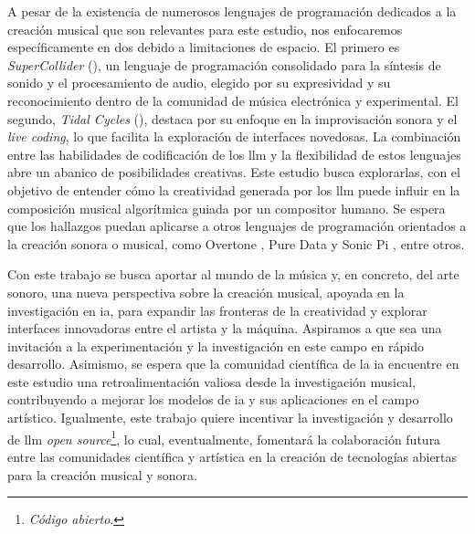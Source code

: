 A pesar de la existencia de numerosos lenguajes de programación dedicados a la creación musical que son relevantes para este estudio, nos enfocaremos específicamente en dos debido a limitaciones de espacio. El primero es \emph{SuperCollider} (\citeyear{SuperCollider2024}), un lenguaje de programación consolidado para la síntesis de sonido y el procesamiento de audio, elegido por su expresividad y su reconocimiento dentro de la comunidad de música electrónica y experimental. El segundo, \emph{Tidal Cycles} (\citeyear{TidalCycles}), destaca por su enfoque en la improvisación sonora y el \emph{live coding}, lo que facilita la exploración de interfaces novedosas. La combinación entre las habilidades de codificación de los \gls{llm} y la flexibilidad de estos lenguajes abre un abanico de posibilidades creativas. Este estudio busca explorarlas, con el objetivo de entender cómo la creatividad generada por los \gls{llm} puede influir en la composición musical algorítmica guiada por un compositor humano. Se espera que los hallazgos puedan aplicarse a otros lenguajes de programación orientados a la creación sonora o musical, como {Overtone} \citep{OvertoneCollaborativeProgrammable}, {Pure Data} \citep{PureDataPd} y {Sonic Pi} \citep{SonicPiLive}, entre otros.

Con este trabajo se busca aportar al mundo de la música y, en concreto, del arte sonoro, una nueva perspectiva sobre la creación musical, apoyada en la investigación en \gls{ia}, para expandir las fronteras de la creatividad y explorar interfaces innovadoras entre el artista y la máquina. Aspiramos a que sea una invitación a la experimentación y la investigación en este campo en rápido desarrollo. 
Asimismo, se espera que la comunidad científica de la \gls{ia} encuentre en este estudio una retroalimentación valiosa desde la investigación musical, contribuyendo a mejorar los modelos de \gls{ia} y sus aplicaciones en el campo artístico. Igualmente, este trabajo quiere incentivar la investigación y desarrollo de \gls{llm} \emph{open source}\footnote{\emph{Código abierto}.}, lo cual, eventualmente, fomentará la colaboración futura entre las comunidades científica y artística en la creación de tecnologías abiertas para la creación musical y sonora.